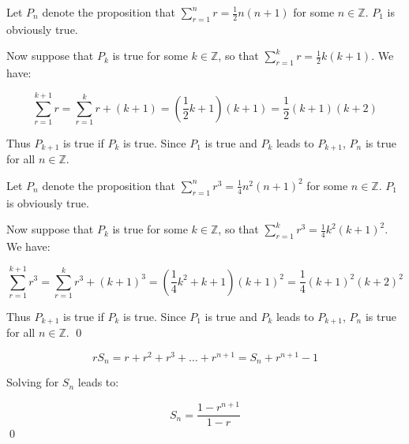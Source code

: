 \documentclass[12pt]{article}
\begin{document}

Let $P_{n}$ denote the proposition that $\sum_{r = 1}^{n} r = \frac{1}{2}n (n + 1)$ for some $n \in \mathbb{Z}$. $P_{1}$ is obviously true.

Now suppose that $P_{k}$ is true for some $k \in \mathbb{Z}$, so that $\sum_{r = 1}^{k} r = \frac{1}{2}k (k + 1)$. We have:

\begin{equation}
    \sum_{r = 1}^{k + 1} r = \sum_{r = 1}^{k} r + (k + 1) = (\frac{1}{2}k + 1)(k + 1) = \frac{1}{2} (k + 1) (k + 2)
\end{equation}

Thus $P_{k + 1}$ is true if $P_{k}$ is true. Since $P_{1}$ is true and $P_{k}$ leads to $P_{k + 1}$, $P_{n}$ is true for all $n \in \mathbb{Z}$.

Let $P_{n}$ denote the proposition that $\sum_{r = 1}^{n} r^{3} = \frac{1}{4}n^{2} (n + 1)^{2}$ for some $n \in \mathbb{Z}$. $P_{1}$ is obviously true.

Now suppose that $P_{k}$ is true for some $k \in \mathbb{Z}$, so that $\sum_{r = 1}^{k} r^{3} = \frac{1}{4}k^{2} (k + 1)^{2}$. We have:

\begin{equation}
    \sum_{r = 1}^{k + 1} r^{3} = \sum_{r = 1}^{k} r^{3} + (k + 1)^{3} = (\frac{1}{4}k^{2} + k + 1) (k + 1)^{2} = \frac{1}{4} (k + 1)^{2} (k + 2)^{2}
\end{equation}

Thus $P_{k + 1}$ is true if $P_{k}$ is true. Since $P_{1}$ is true and $P_{k}$ leads to $P_{k + 1}$, $P_{n}$ is true for all $n \in \mathbb{Z}$.
\qed


\begin{equation}
    r S_{n} = r + r^{2} + r^{3} + \dots + r^{n+1} = S_{n} + r^{n+1} - 1
\end{equation}

Solving for $S_{n}$ leads to:

\begin{equation}
    S_{n} = \frac{1 - r^{n+1}}{1 - r}
\end{equation}
\qed
\end{document}
